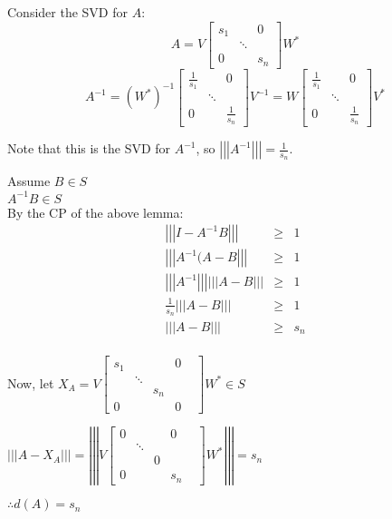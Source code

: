 \documentclass[letterpaper,12pt,fleqn]{article}
\newcommand{\mnorm}[1]{\left|\left|\left|#1\right|\right|\right|}
\begin{document}
\begin{theproof}
  Consider the SVD for $A$:
  \[A=V\begin{bmatrix} s_1 & & 0 \\ & \ddots & \\ 0 & & s_n \end{bmatrix}W^*\]
  \[A^{-1}=(W^*)^{-1}
  \begin{bmatrix} \frac{1}{s_1} & & 0 \\ & \ddots & \\ 0 & & \frac{1}{s_n}
  \end{bmatrix}V^{-1}=
  W\begin{bmatrix} \frac{1}{s_1} & & 0 \\ & \ddots & \\ 0 & & \frac{1}{s_n}
  \end{bmatrix}V^*\]
  
  Note that this is the SVD for $A^{-1}$, so $\mnorm{A^{-1}}=\frac{1}{s_n}$.

  Assume $B\in S$ \\
  $A^{-1}B\in S$ \\
  By the CP of the above lemma:
  \begin{eqnarray*}
    \mnorm{I-A^{-1}B} &\ge& 1 \\
    \mnorm{A^{-1}(A-B} &\ge& 1 \\
    \mnorm{A^{-1}}\mnorm{A-B} &\ge& 1 \\
    \frac{1}{s_n}\mnorm{A-B} &\ge& 1 \\
    \mnorm{A-B} &\ge& s_n \\
  \end{eqnarray*}

  Now, let $X_A=V\begin{bmatrix}
  s_1 & & & 0 \\
  & \ddots & & \\
  & & s_n & & \\
  0 & & & 0
  \end{bmatrix}W^*\in S$

  $\mnorm{A-X_A}=\mnorm{V\begin{bmatrix}
  0 & & & 0 \\
  & \ddots & & \\
  & & 0 & & \\
  0 & & & s_n
    \end{bmatrix}W^*}=s_n$

  $\therefore d(A)=s_n$
\end{theproof}
\end{document}
